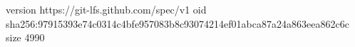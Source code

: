version https://git-lfs.github.com/spec/v1
oid sha256:97915393e74c0314c4bfe957083b8c93074214ef01abca87a24a863eea862c6c
size 4990
